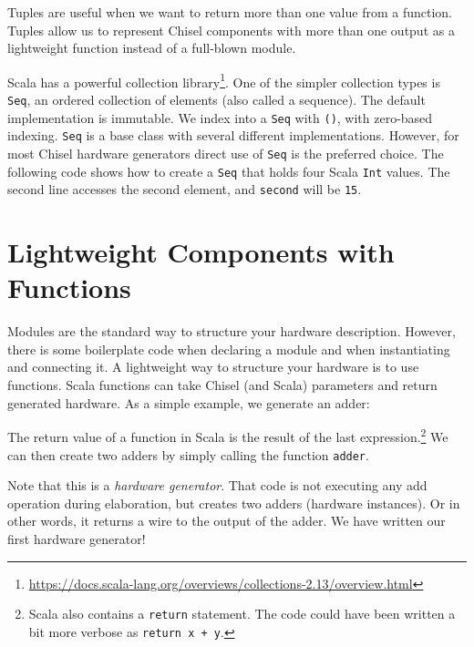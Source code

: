 \documentclass[%
    10pt,
    headinclude, footexclude,
    openright, %
    notitlepage,
    cleardoubleempty,
    headsepline,
    pointlessnumbers,
    bibtotoc, idxtotoc,
    ]{scrbook}
\newcommand{\code}[1]{{\lstinline[basicstyle=\small\ttfamily]{#1}}}
\newcommand{\codefoot}[1]{{\lstinline[basicstyle=\footnotesize\ttfamily]{#1}}}
\newcommand{\myref}[2]{\href{#1}{#2}}
\renewcommand{\myref}[2]{{#2}{\footnote{\url{#1}}}}
\begin{document}


\noindent Tuples are useful when we want to return more than one value from a function.
Tuples allow us to represent Chisel components with more than one output as a lightweight
function instead of a full-blown module.

Scala has a powerful \myref{https://docs.scala-lang.org/overviews/collections-2.13/overview.html}{collection library}.
One of the simpler collection types is \code{Seq}, an ordered collection of elements (also called a sequence).
The default implementation is immutable. We index into a \code{Seq} with \code{()},
with zero-based indexing.
\code{Seq} is a base class with several different implementations.
However, for most Chisel hardware generators direct use of \code{Seq}
is the preferred choice. The following code shows how to create a \code{Seq}
that holds four Scala \code{Int} values. The second line accesses the
second element, and \code{second} will be \code{15}.






\section{Lightweight Components with Functions}
\label{sec:functions}


Modules are the standard way to structure your hardware description.
However, there is some boilerplate code when declaring a module and when instantiating and
connecting it.
A lightweight way to structure your hardware is to use functions.
Scala functions can take Chisel (and Scala) parameters and return generated hardware.
As a simple example, we generate an adder:


\noindent The return value of a function in Scala is the result of the last
expression.\footnote{Scala also contains a \codefoot{return} statement. The code could have been written
a bit more verbose as \codefoot{return x + y}.}
We can then create two adders by simply calling the function \code{adder}.


\noindent Note that this is a \emph{hardware generator}. That code is not executing any add operation
during elaboration, but creates two adders (hardware instances). Or in other words, it returns
a wire to the output of the adder.
We have written our first hardware generator!
\end{document}
